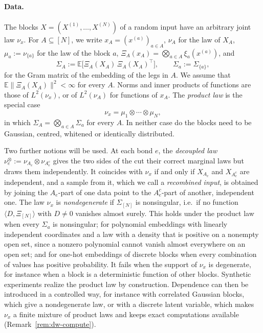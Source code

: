 \documentclass[11pt]{article}
\newcommand{\E}{\mathbb{E}}
\newcommand{\norm}[1]{\lVert #1\rVert}
\theoremstyle{definition}
\numberwithin{equation}{section}
\begin{document}
\paragraph{Data.}
The blocks $X=(X^{(1)},\dots,X^{(N)})$ of a random input have an arbitrary joint law $\nu_x$. For $A\subseteq[N]$, we write $x_A=(x^{(a)})_{a\in A}$, $\nu_A$ for the law of $X_A$, $\mu_a:=\nu_{\{a\}}$ for the law of the block $a$, $\Xi_A(x_A)=\bigotimes_{a\in A}\xi_a(x^{(a)})$, and
\begin{equation}\label{eq:gram}
\Sigma_A:=\E\big[\Xi_A(X_A)\,\Xi_A(X_A)^\top\big],\qquad\Sigma_a:=\Sigma_{\{a\}},
\end{equation}
for the Gram matrix of the embedding of the legs in $A$. We assume that $\E\norm{\Xi_A(X_A)}^2<\infty$ for every $A$. Norms and inner products of functions are those of $L^2(\nu_x)$, or of $L^2(\nu_A)$ for functions of $x_A$. The \emph{product law} is the special case
\begin{equation}\label{eq:independent-blocks}
\nu_x=\mu_1\otimes\cdots\otimes\mu_N,
\end{equation}
in which $\Sigma_A=\bigotimes_{a\in A}\Sigma_a$ for every $A$. In neither case do the blocks need to be Gaussian, centred, whitened or identically distributed.

Two further notions will be used. At each bond $e$, the \emph{decoupled law} $\nu^\otimes_e:=\nu_{A_e}\otimes\nu_{A_e^c}$ gives the two sides of the cut their correct marginal laws but draws them independently. It coincides with $\nu_x$ if and only if $X_{A_e}$ and $X_{A_e^c}$ are independent, and a sample from it, which we call a \emph{recombined input}, is obtained by joining the $A_e$-part of one data point to the $A_e^c$-part of another, independent one. The law $\nu_x$ is \emph{nondegenerate} if $\Sigma_{[N]}$ is nonsingular, i.e.\ if no function $\langle D,\Xi_{[N]}\rangle$ with $D\neq0$ vanishes almost surely. This holds under the product law when every $\Sigma_a$ is nonsingular; for polynomial embeddings with linearly independent coordinates and a law with a density that is positive on a nonempty open set, since a nonzero polynomial cannot vanish almost everywhere on an open set; and for one-hot embeddings of discrete blocks when every combination of values has positive probability. It fails when the support of $\nu_x$ is degenerate, for instance when a block is a deterministic function of other blocks. Synthetic experiments realize the product law by construction. Dependence can then be introduced in a controlled way, for instance with correlated Gaussian blocks, which give a nondegenerate law, or with a discrete latent variable, which makes $\nu_x$ a finite mixture of product laws and keeps exact computations available (Remark~\ref{rem:dw-compute}).
\end{document}
